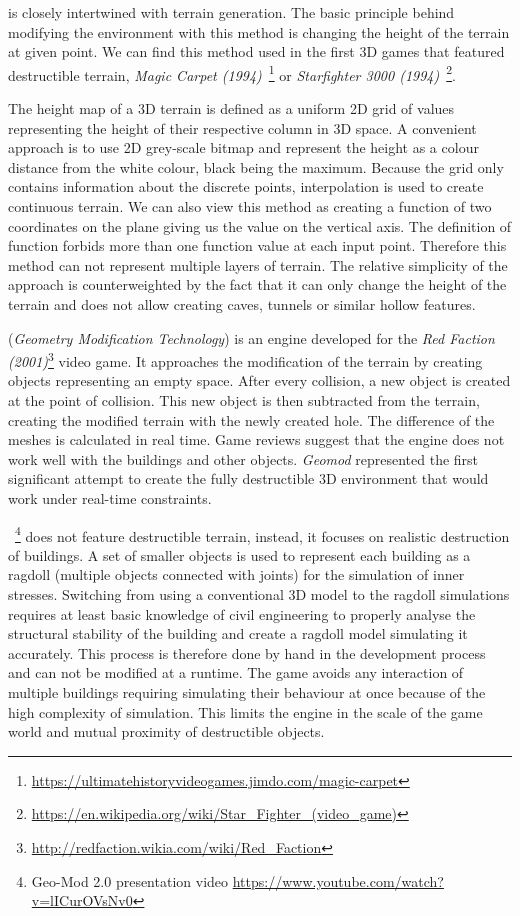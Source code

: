  is closely intertwined with terrain generation. The basic principle behind modifying the environment with this method is changing the height of the terrain at given point. We can find this method used in the first 3D games that featured destructible terrain, \eg \emph{Magic Carpet (1994)}~\footnote{\url{https://ultimatehistoryvideogames.jimdo.com/magic-carpet}} or \emph{Starfighter 3000 (1994)}~\footnote{\url{https://en.wikipedia.org/wiki/Star\_Fighter\_(video\_game)}}.

The height map of a 3D terrain is defined as a uniform 2D grid of values representing the height of their respective column in 3D space. A convenient approach is to use 2D grey-scale bitmap and represent the height as a colour distance from the white colour, black being the maximum. Because the grid only contains information about the discrete points, interpolation is used to create continuous terrain. We can also view this method as creating a function of two coordinates on the plane giving us the value on the vertical axis. The definition of function forbids more than one function value at each input point. Therefore this method can not represent multiple layers of terrain. The relative simplicity of the approach is counterweighted by the fact that it can only change the height of the terrain and does not allow creating caves, tunnels or similar hollow features.

 (\emph{Geometry Modification Technology}\cite{geomod}) is an engine developed for the \emph{Red Faction (2001)}\footnote{\url{http://redfaction.wikia.com/wiki/Red\_Faction}} video game. It approaches the modification of the terrain by creating objects representing an empty space. After every collision, a new object is created at the point of collision. This new object is then subtracted from the terrain, creating the modified terrain with the newly created hole. The difference of the meshes is calculated in real time. Game reviews suggest that the engine does not work well with the buildings and other objects. \emph{Geomod} represented the first significant attempt to create the fully destructible 3D environment that would work under real-time constraints.

~\cite{geomod}\footnote{Geo-Mod 2.0 presentation video \url{https://www.youtube.com/watch?v=lICurOVsNv0}} does not feature destructible terrain, instead, it focuses on realistic destruction of buildings. A set of smaller objects is used to represent each building as a ragdoll (multiple objects connected with joints) for the simulation of inner stresses. Switching from using a conventional 3D model to the ragdoll simulations requires at least basic knowledge of civil engineering to properly analyse the structural stability of the building and create a ragdoll model simulating it accurately. This process is therefore done by hand in the development process and can not be modified at a runtime.  The game avoids any interaction of multiple buildings requiring simulating their behaviour at once because of the high complexity of simulation. This limits the engine in the scale of the game world and mutual proximity of destructible objects.


